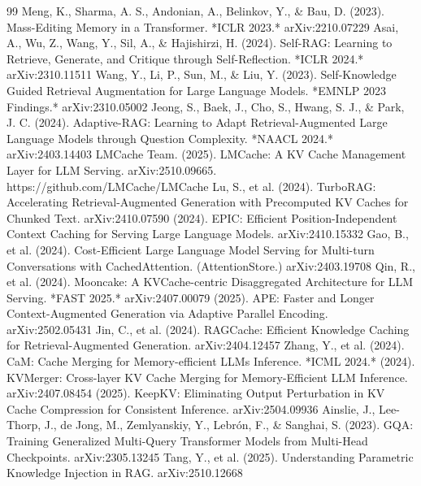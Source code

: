 \documentclass[10pt,twocolumn]{article}
\begin{document}
\begin{thebibliography}{99}
   Meng, K., Sharma, A. S., Andonian, A., Belinkov, Y., \& Bau, D. (2023). Mass-Editing Memory in a Transformer. *ICLR 2023.* arXiv:2210.07229
   Asai, A., Wu, Z., Wang, Y., Sil, A., \& Hajishirzi, H. (2024). Self-RAG: Learning to Retrieve, Generate, and Critique through Self-Reflection. *ICLR 2024.* arXiv:2310.11511
   Wang, Y., Li, P., Sun, M., \& Liu, Y. (2023). Self-Knowledge Guided Retrieval Augmentation for Large Language Models. *EMNLP 2023 Findings.* arXiv:2310.05002
   Jeong, S., Baek, J., Cho, S., Hwang, S. J., \& Park, J. C. (2024). Adaptive-RAG: Learning to Adapt Retrieval-Augmented Large Language Models through Question Complexity. *NAACL 2024.* arXiv:2403.14403
   LMCache Team. (2025). LMCache: A KV Cache Management Layer for LLM Serving. arXiv:2510.09665. https://github.com/LMCache/LMCache
   Lu, S., et al. (2024). TurboRAG: Accelerating Retrieval-Augmented Generation with Precomputed KV Caches for Chunked Text. arXiv:2410.07590
   (2024). EPIC: Efficient Position-Independent Context Caching for Serving Large Language Models. arXiv:2410.15332
   Gao, B., et al. (2024). Cost-Efficient Large Language Model Serving for Multi-turn Conversations with CachedAttention. (AttentionStore.) arXiv:2403.19708
   Qin, R., et al. (2024). Mooncake: A KVCache-centric Disaggregated Architecture for LLM Serving. *FAST 2025.* arXiv:2407.00079
   (2025). APE: Faster and Longer Context-Augmented Generation via Adaptive Parallel Encoding. arXiv:2502.05431
   Jin, C., et al. (2024). RAGCache: Efficient Knowledge Caching for Retrieval-Augmented Generation. arXiv:2404.12457
   Zhang, Y., et al. (2024). CaM: Cache Merging for Memory-efficient LLMs Inference. *ICML 2024.*
   (2024). KVMerger: Cross-layer KV Cache Merging for Memory-Efficient LLM Inference. arXiv:2407.08454
   (2025). KeepKV: Eliminating Output Perturbation in KV Cache Compression for Consistent Inference. arXiv:2504.09936
   Ainslie, J., Lee-Thorp, J., de Jong, M., Zemlyanskiy, Y., Lebr\'{o}n, F., \& Sanghai, S. (2023). GQA: Training Generalized Multi-Query Transformer Models from Multi-Head Checkpoints. arXiv:2305.13245
   Tang, Y., et al. (2025). Understanding Parametric Knowledge Injection in RAG. arXiv:2510.12668
\end{thebibliography}
\end{document}
